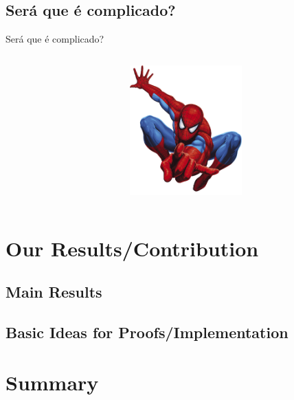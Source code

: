 \documentclass{beamer}
\begin{document}
\subsection{Será que é complicado?}

\begin{frame}{Será que é complicado?}
	\begin{columns}
           \begin{column}{.5\textwidth}               
           \end{column}
           \begin{column}{.5\textwidth}
               \includegraphics[height=5cm]{spiderman.png}
           \end{column}
	\end{columns}

\end{frame}
 

\section{Our Results/Contribution}

\subsection{Main Results}

\subsection{Basic Ideas for Proofs/Implementation}


\section*{Summary}
\end{document}
